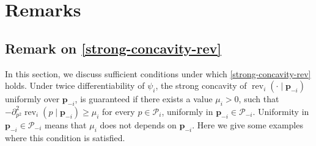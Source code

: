 \documentclass{article} %
\begin{document}
\newpage

\section{Remarks}\label{app:remarks}

\subsection{Remark on \cref{strong-concavity-rev}}\label{sec:remark_on_smoothness_assumption}

In this section, we discuss sufficient conditions under which \cref{strong-concavity-rev} holds. Under twice differentiability of $\psi_i$, the strong concavity of $\operatorname{rev}_i\left(\cdot \mid \mathbf{p}_{-i}\right)$ uniformly over $\mathbf{p}_{-i}$, is guaranteed if there exists a value $\mu_i > 0$, such that $-\partial^2_{p^2}  \operatorname{rev}_i(p \mid \mathbf{p}_{-i})\geq \mu_i$ for every $p \in \mathcal{P}_i$, uniformly in $\mathbf{p}_{-i}\in \mathcal{P}_{-i}$. Uniformity in $\mathbf{p}_{-i}\in \mathcal{P}_{-i}$ means that $\mu_i$ does not depends on $\mathbf{p}_{-i}$. Here we give some examples where this condition is satisfied.
\end{document}
